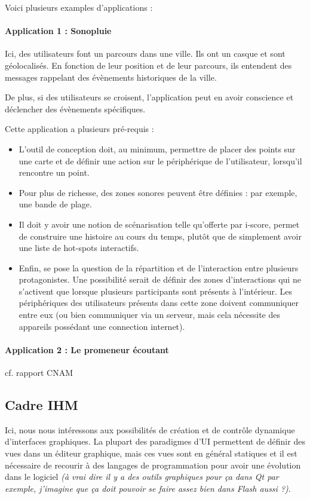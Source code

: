 \documentclass[french]{article}
\begin{document}
Voici plusieurs examples d'applications :
\paragraph{Application 1 : Sonopluie}
Ici, des utilisateurs font un parcours dans une ville. Ils ont un casque et sont géolocalisés. En fonction de leur position et de leur parcours, ils entendent des messages rappelant des évènements historiques de la ville. 

De plus, si des utilisateurs se croisent, l'application peut en avoir conscience et déclencher des évènements spécifiques.

Cette application a plusieurs pré-requis : 
\begin{itemize}
\item L'outil de conception doit, au minimum, permettre de placer des points sur une carte et de définir une action sur le périphérique de l'utilisateur, lorsqu'il rencontre un point.
\item Pour plus de richesse, des zones sonores peuvent être définies : par exemple, une bande de plage.
\item Il doit y avoir une notion de scénarisation telle qu'offerte par i-score, permet de construire une histoire au cours du temps, plutôt que de simplement avoir une liste de hot-spots interactifs.
\item Enfin, se pose la question de la répartition et de l'interaction entre plusieurs protagonistes. Une possibilité serait de définir des zones d'interactions qui ne s'activent que lorsque plusieurs participants sont présents à l'intérieur. Les périphériques des utilisateurs présents dans cette zone doivent communiquer entre eux (ou bien communiquer via un serveur, mais cela nécessite des appareils possédant une connection internet).
\end{itemize}

\paragraph{Application 2 : Le promeneur écoutant}

cf. rapport CNAM 


\subsection{Cadre IHM}
Ici, nous nous intéressons aux possibilités de création et de contrôle dynamique d'interfaces graphiques. La plupart des paradigmes d'UI permettent de définir des vues dans un éditeur graphique, mais ces vues sont en général statiques et il est nécessaire de recourir à des langages de programmation pour avoir une évolution dans le logiciel \textit{(à vrai dire il y a des outils graphiques pour ça dans Qt par exemple, j'imagine que ça doit pouvoir se faire assez bien dans Flash aussi ?)}. 
\end{document}

